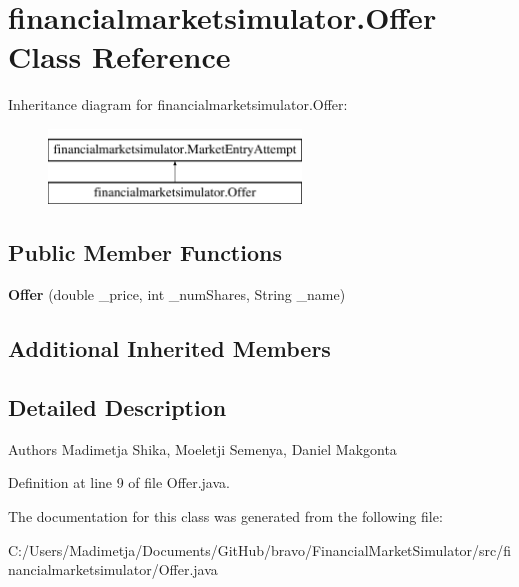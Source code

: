 \hypertarget{classfinancialmarketsimulator_1_1_offer}{\section{financialmarketsimulator.\+Offer Class Reference}
\label{classfinancialmarketsimulator_1_1_offer}
}
Inheritance diagram for financialmarketsimulator.\+Offer\+:\begin{figure}[H]
\begin{center}
\leavevmode
\includegraphics[height=2.000000cm]{classfinancialmarketsimulator_1_1_offer}
\end{center}
\end{figure}
\subsection*{Public Member Functions}
\begin{DoxyCompactItemize}
\item 
\hypertarget{classfinancialmarketsimulator_1_1_offer_a155651fa401d386b3e97067f02300b18}{{\bfseries Offer} (double \+\_\+price, int \+\_\+num\+Shares, String \+\_\+name)}\label{classfinancialmarketsimulator_1_1_offer_a155651fa401d386b3e97067f02300b18}

\end{DoxyCompactItemize}
\subsection*{Additional Inherited Members}


\subsection{Detailed Description}
\begin{DoxyAuthor}{Authors}
Madimetja Shika, Moeletji Semenya, Daniel Makgonta 
\end{DoxyAuthor}


Definition at line 9 of file Offer.\+java.



The documentation for this class was generated from the following file\+:\begin{DoxyCompactItemize}
\item 
C\+:/\+Users/\+Madimetja/\+Documents/\+Git\+Hub/bravo/\+Financial\+Market\+Simulator/src/financialmarketsimulator/Offer.\+java\end{DoxyCompactItemize}
